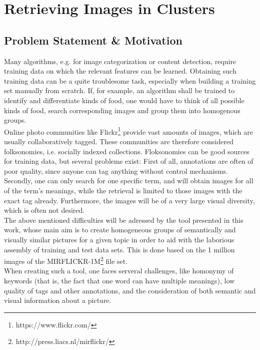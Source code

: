 \section{Retrieving Images in Clusters}
\label{sec_introduction}


\subsection{Problem Statement \& Motivation}
Many algorithms, e.g. for image categorization or content detection, require training data on which the relevant features can be learned. Obtaining such training data can be a quite troublesome task, especially when building a training set manually from scratch. If, for example, an algorithm shall be trained to identify and differentiate kinds of food, one would have to think of all possible kinds of food, search corresponding images and group them into homogenous groups. \\
Online photo communities like Flickr\footnote{https://www.flickr.com/} provide vast amounts of images, which are usually collaboratively tagged. These communities are therefore considered folksonomies, i.e. socially indexed collections.
Floksonomies can be good sources for training data, but several problems exist: First of all, annotations are often of poor quality, since anyone can tag anything without control mechanisms. Secondly, one can only search for one specific term, and will obtain images for all of the term's meanings, while the retrieval is limited to those images with the exact tag already. Furthermore, the images will be of a very large visual diversity, which is often not desired. \\

The above mentioned difficulties will be adressed by the tool presented in this work, whose main aim is to create homogeneous groups of semantically and visually similar pictures for a given topic in order to aid with the laborious assembly of training and test data sets. This is done based on the 1 million images of the MIRFLICKR-1M\footnote{http://press.liacs.nl/mirflickr/} file set. \\
When creating such a tool, one faces serveral challenges, like homonymy of keywords (that is, the fact that one word can have multiple meanings), low quality of tags and other annotations, and the consideration of both semantic and visual information about a picture.  

